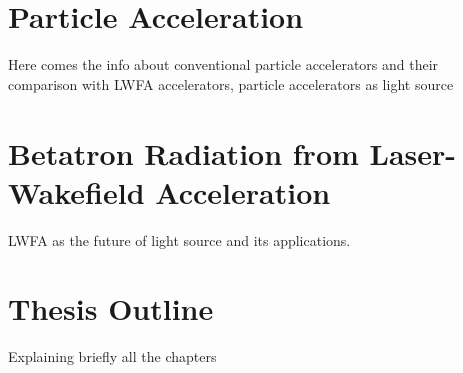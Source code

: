 

\section{Particle Acceleration}

Here comes the info about conventional particle accelerators and their comparison with LWFA accelerators, particle accelerators as light source
\section{Betatron Radiation from Laser-Wakefield Acceleration}

LWFA as the future of light source and its applications.

\section{Thesis Outline}

Explaining briefly all the chapters
